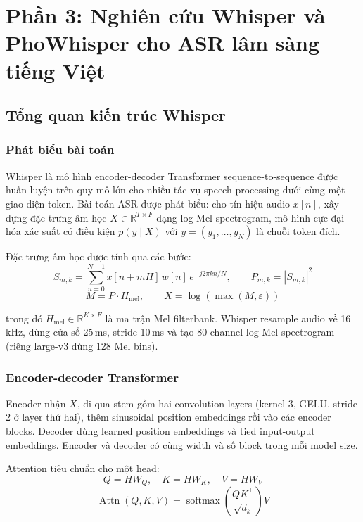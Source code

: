 \section{Phần 3: Nghiên cứu Whisper và PhoWhisper cho ASR lâm sàng tiếng Việt}

\subsection{Tổng quan kiến trúc Whisper}

\subsubsection{Phát biểu bài toán}

Whisper là mô hình encoder-decoder Transformer sequence-to-sequence được huấn luyện trên quy mô lớn cho nhiều tác vụ speech processing dưới cùng một giao diện token. Bài toán ASR được phát biểu: cho tín hiệu audio $x[n]$, xây dựng đặc trưng âm học $X \in \mathbb{R}^{T \times F}$ dạng log-Mel spectrogram, mô hình cực đại hóa xác suất có điều kiện $p(y \mid X)$ với $y = (y_1, \dots, y_N)$ là chuỗi token đích.

Đặc trưng âm học được tính qua các bước:
\[
S_{m,k} = \sum_{n=0}^{N-1} x[n + mH] \, w[n] \, e^{-j2\pi kn/N}, \qquad P_{m,k} = |S_{m,k}|^2
\]
\[
M = P \cdot H_{\text{mel}}, \qquad X = \log(\max(M, \varepsilon))
\]

trong đó $H_{\text{mel}} \in \mathbb{R}^{K \times F}$ là ma trận Mel filterbank. Whisper resample audio về 16\,kHz, dùng cửa sổ 25\,ms, stride 10\,ms và tạo 80-channel log-Mel spectrogram (riêng large-v3 dùng 128 Mel bins).

\subsubsection{Encoder-decoder Transformer}

Encoder nhận $X$, đi qua stem gồm hai convolution layers (kernel 3, GELU, stride 2 ở layer thứ hai), thêm sinusoidal position embeddings rồi vào các encoder blocks. Decoder dùng learned position embeddings và tied input-output embeddings. Encoder và decoder có cùng width và số block trong mỗi model size.

Attention tiêu chuẩn cho một head:
\[
Q = HW_Q, \quad K = HW_K, \quad V = HW_V
\]
\[
\operatorname{Attn}(Q,K,V) = \operatorname{softmax}\!\left(\frac{QK^\top}{\sqrt{d_k}}\right)V
\]

